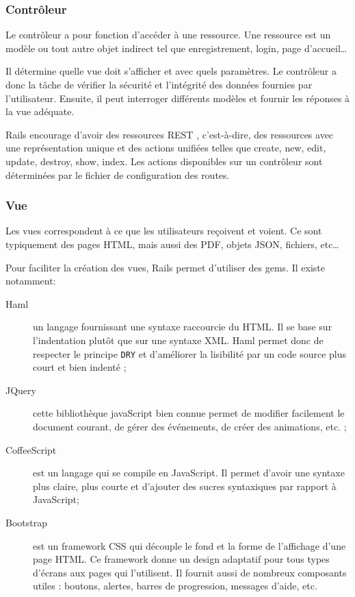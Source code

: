 \subsubsection{Contrôleur}
\label{controleur}
Le contrôleur a pour fonction d'accéder à une ressource. Une ressource est un modèle ou tout autre objet indirect tel que enregistrement, login, page d'accueil\ldots  

Il détermine quelle vue doit s'afficher et avec quels paramètres. Le contrôleur a donc la tâche de vérifier la sécurité et l'intégrité des données fournies par l'utilisateur. Ensuite, il peut interroger différents modèles et fournir les réponses à la vue adéquate.

\label{rest}\label{rails-routes}
Rails encourage d'avoir des ressources REST \cite{wiki-rest}, c'est-à-dire, des ressources avec une représentation unique et des actions unifiées telles que create, new, edit, update, destroy, show, index. Les actions disponibles sur un contrôleur sont déterminées par le fichier de configuration des routes.

\subsubsection{Vue} 
Les vues correspondent à ce que les utilisateurs reçoivent et voient. Ce sont typiquement des pages HTML, mais aussi des PDF, objets JSON, fichiers, etc\ldots

Pour faciliter la création des vues, Rails permet d'utiliser des gems. Il existe notamment: 
\begin{description}
  \item[Haml \cite{haml} \label{haml}] un langage fournissant une syntaxe raccourcie du HTML. Il se base sur l'indentation plutôt que sur une syntaxe XML. Haml permet donc de respecter le principe \texttt{DRY} et d'améliorer la lisibilité par un code source plus court et bien indenté ;
  \item[JQuery \cite{jquery}] cette bibliothèque javaScript bien connue permet de modifier facilement le document courant, de gérer des événements, de créer des animations, etc. ;
  \item[CoffeeScript \cite{coffeescript}] est un langage qui se compile en JavaScript. Il permet d'avoir une syntaxe plus claire, plus courte et d'ajouter des sucres syntaxiques par rapport à JavaScript;
  \item[Bootstrap \cite{bootstrap}] est un framework CSS qui découple le fond et la forme de l'affichage d'une page HTML. Ce framework donne un design adaptatif pour tous types d'écrans aux pages qui l'utilisent. Il fournit aussi de nombreux composants utiles : boutons, alertes, barres de progression, messages d'aide, etc. \label{bootstrap}
\end{description}
